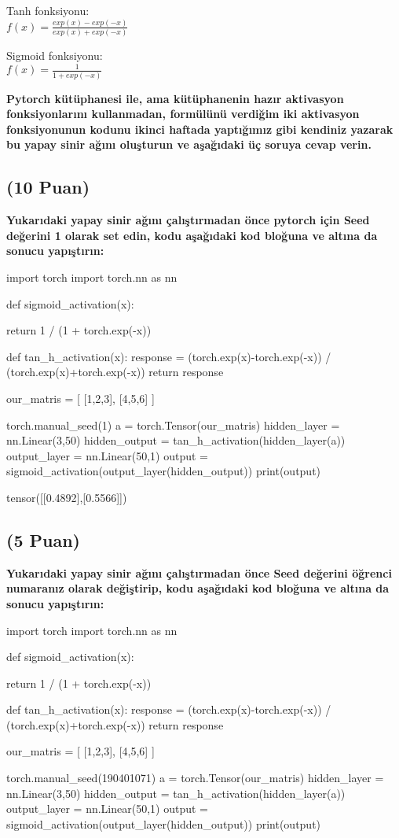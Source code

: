 \documentclass[11pt]{article}
\begin{document}
Tanh fonksiyonu:\\
$f(x) = \frac{exp(x) - exp(-x)}{exp(x) + exp(-x)}$
\vspace{.2in}

Sigmoid fonksiyonu:\\
$f(x) = \frac{1}{1 + exp(-x)}$

\vspace{.2in}
 \textbf{Pytorch kütüphanesi ile, ama kütüphanenin hazır aktivasyon fonksiyonlarını kullanmadan, formülünü verdiğim iki aktivasyon fonksiyonunun kodunu ikinci haftada yaptığımız gibi kendiniz yazarak bu yapay sinir ağını oluşturun ve aşağıdaki üç soruya cevap verin.}
 
\subsection{(10 Puan)} \textbf{Yukarıdaki yapay sinir ağını çalıştırmadan önce pytorch için Seed değerini 1 olarak set edin, kodu aşağıdaki kod bloğuna ve altına da sonucu yapıştırın:}

\begin{python}
import torch
import torch.nn as nn

def sigmoid_activation(x):

  return 1 / (1 + torch.exp(-x))

def tan_h_activation(x):
  response = (torch.exp(x)-torch.exp(-x)) / (torch.exp(x)+torch.exp(-x))
  return response

our_matris = [
    [1,2,3],
    [4,5,6]
]

torch.manual_seed(1)
a = torch.Tensor(our_matris)
hidden_layer = nn.Linear(3,50)
hidden_output = tan_h_activation(hidden_layer(a))
output_layer = nn.Linear(50,1)
output = sigmoid_activation(output_layer(hidden_output))
print(output)
\end{python}

tensor([[0.4892],[0.5566]])

\subsection{(5 Puan)} \textbf{Yukarıdaki yapay sinir ağını çalıştırmadan önce Seed değerini öğrenci numaranız olarak değiştirip, kodu aşağıdaki kod bloğuna ve altına da sonucu yapıştırın:}

\begin{python}
import torch
import torch.nn as nn

def sigmoid_activation(x):

  return 1 / (1 + torch.exp(-x))

def tan_h_activation(x):
  response = (torch.exp(x)-torch.exp(-x)) / (torch.exp(x)+torch.exp(-x))
  return response

our_matris = [
    [1,2,3],
    [4,5,6]
]

torch.manual_seed(190401071)
a = torch.Tensor(our_matris)
hidden_layer = nn.Linear(3,50)
hidden_output = tan_h_activation(hidden_layer(a))
output_layer = nn.Linear(50,1)
output = sigmoid_activation(output_layer(hidden_output))
print(output)
\end{python}
\end{document}
